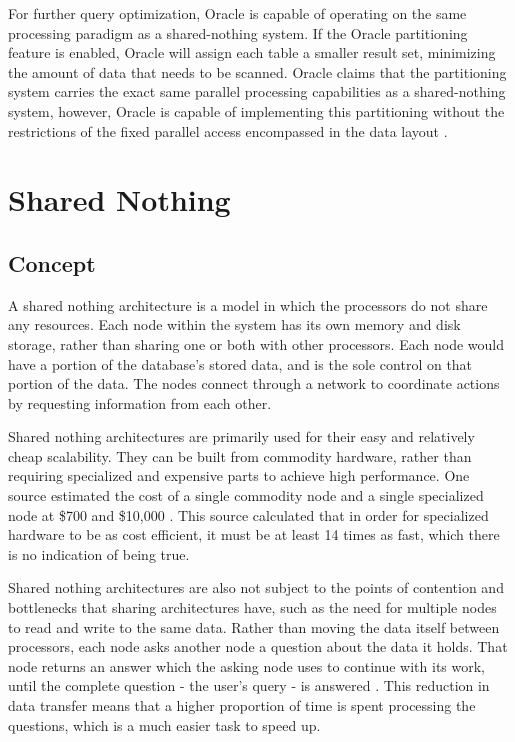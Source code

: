 \documentclass[onecolumn, draftclsnofoot,10pt, compsoc]{IEEEtran}
\begin{document}
\indent For further query optimization, Oracle is capable of operating on the same processing paradigm as a shared-nothing system.
If the Oracle partitioning feature is enabled, Oracle will assign each table a smaller result set, minimizing the amount of data that needs to be scanned. 
Oracle claims that the partitioning system carries the exact same parallel processing capabilities as a shared-nothing system, however, Oracle is capable of implementing this partitioning without the restrictions of the fixed parallel access encompassed in the data layout \cite{OraclePEwODF}.  

	\section{Shared Nothing}
    \subsection{Concept}
A shared nothing architecture is a model in which the processors do not share any resources. 
Each node within the system has its own memory and disk storage, rather than sharing one or both with other processors.
Each node would have a portion of the database’s stored data, and is the sole control on that portion of the data. 
The nodes connect through a network to coordinate actions by requesting information from each other. 

Shared nothing architectures are primarily used for their easy and relatively cheap scalability.
They can be built from commodity hardware, rather than requiring specialized and expensive parts to achieve high performance. 
One source estimated the cost of a single commodity node and a single specialized node at \$700 and \$10,000 \cite{HiPerf}. 
This source calculated that in order for specialized hardware to be as cost efficient, it must be at least 14 times as fast, which there is no indication of being true.

Shared nothing architectures are also not subject to the points of contention and bottlenecks that sharing architectures have, such as the need for multiple nodes to read and write to the same data.
Rather than moving the data itself between processors, each node asks another node a question about the data it holds.
That node returns an answer which the asking node uses to continue with its work, until the complete question - the user’s query - is answered \cite{DeWittFuture}.
This reduction in data transfer means that a higher proportion of time is spent processing the questions, which is a much easier task to speed up.
\end{document}
